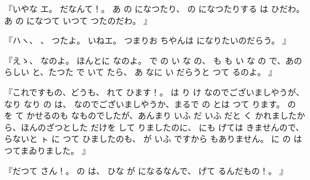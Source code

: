 『いやな
エ。
だなんて！。
あ
の
になつたり、
の
になつたりする
は
ひだわ。
あ
の
になつて
いつて
つたのだわ。
』

『ハヽ、
、
つたよ。
いねエ。
つまりお
ちやんは
になりたいのだらう。
』

『えゝ、
なのよ。
ほんとに
なのよ。
で
の
い
な
の、
も
も
い
な
の
で、あの
らしい
と、たつた
で
いて
たら、
あ
なに
い
だらうと
つて
るのよ。
』

『これですもの、どうも、
れて
ひます！。
は
り
け
なのでございましやうが、
なり
なり
の
は、
なのでございましやうか、まるで
の
とは
つて
ります。
の
を
て
かせるのも
なものでしたが、あんまり
いふ
だ
いふ
だと
く
かれましたから、ほんのざつとした
だけを
して
りましたのに、
にも
げては
きませんので、
らないと
ㇳ
に
つて
ひましたのも、
が
いふ
ですから
もありません。
に
の
は
つてまゐりました。
』

『だつて
さん！。
の
は、
ひな
が
になるなんで、
げて
るんだもの！。
』

